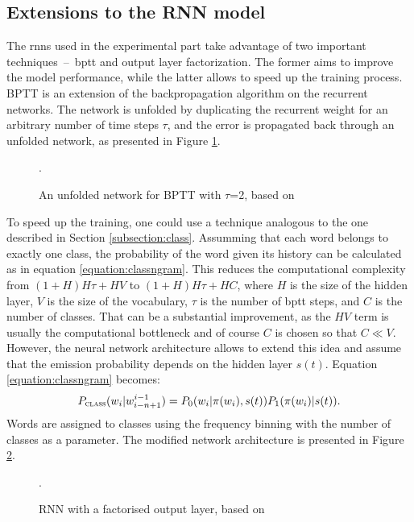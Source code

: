 \subsection{Extensions to the RNN model}
The \glspl{rnn} used in the experimental part take advantage of two important techniques~--~\gls{bptt} and output layer factorization. The former aims to improve the model performance, while the latter allows to speed up the training process. BPTT is an extension of the backpropagation algorithm on the recurrent networks. The network is unfolded by duplicating the recurrent weight for an arbitrary number of time steps $\tau$, and the error is propagated back through an unfolded network, as presented in Figure \ref{figure:unfolding}.

	\begin{figure}[htbp]
		\centering
		
		\caption[An example of \acrlong{bptt}]{An unfolded network for BPTT with $\tau$=2, based on \cite{boden2002guide}}.
		\label{figure:unfolding}
	\end{figure}

	To speed up the training, one could use a technique analogous to the one described in Section \ref{subsection:class}. Assumming that each word belongs to exactly one class, the probability of the word given its history can be calculated as in equation \ref{equation:classngram}. This reduces the computational complexity from $(1+H)H\tau+HV$ to $(1+H)H\tau+HC$, where $H$ is the size of the hidden layer, $V$ is the size of the vocabulary, $\tau$ is the number of \gls{bptt} steps, and $C$ is the number of classes. That can be a substantial improvement, as the $HV$ term is usually the computational bottleneck and of course $C$ is chosen so that $C\ll V$. However, the neural network architecture allows to extend this idea and assume that the emission probability depends on the hidden layer $s(t)$. Equation \ref{equation:classngram} becomes:
	\begin{equation}
		P_{\textsc{class}}(w_{i}|w_{i-n+1}^{i-1})=P_{0}(w_{i}|\pi(w_{i}), s(t))P_{1}(\pi(w_{i})|s(t)).
		\label{equation:classneural}
	\end{equation}
	Words are assigned to classes using the frequency binning with the number of classes as a parameter. The modified network architecture is presented in Figure \ref{figure:rnnclass}. 

	\begin{figure}[htbp]
		\centering
		
		\caption[A \acrlong{rnn} with a factorised output layer]{RNN with a factorised output layer, based on \cite{mikolov2011extensions}}.
		\label{figure:rnnclass}
	\end{figure}
	
